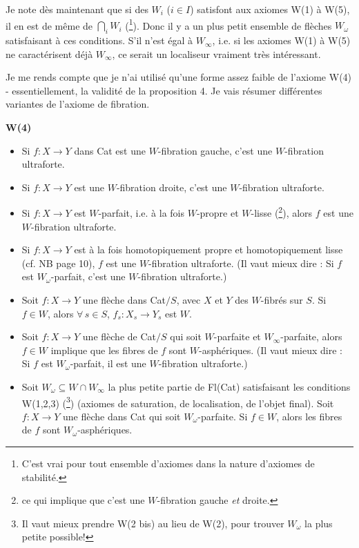 \documentclass[11pt]{article}
\newcommand{\printedpage}[1]{\marginpar{\footnotesize p.~#1}}
\newcommand{\msp}[1]{\marginpar{\footnotesize [#1]}}
\begin{document}
\printedpage{11}

Je note dès maintenant que si des $W_i$ ($i \in I$) satisfont aux axiomes W(1) à W(5), il en est de même de $\bigcap_i W_i$ (\footnote[30]{C'est vrai pour tout ensemble d'axiomes dans la nature d'axiomes de stabilité.}). Donc il y a un plus petit ensemble de flèches $W_\omega$ satisfaisant à ces conditions. S'il n'est égal à $W_\infty$, i.e. si les axiomes W(1) à W(5) ne caractérisent déjà $W_\infty$, ce serait un localiseur vraiment très intéressant.

Je me rends compte que je n'ai utilisé qu'une forme assez faible de l'axiome W(4) - essentiellement, la validité de la proposition 4. Je vais résumer différentes variantes de l'axiome de fibration.

\textbf{W(4)}

\begin{itemize}[leftmargin=4em, labelwidth=2.5em, labelsep=0.6em, align=right]
\item[a$_1$)] Si $f : X \longrightarrow Y$ dans Cat est une $W$-fibration gauche, c'est une $W$-fibration ultraforte.

\item[a$_2$)] Si $f : X \longrightarrow Y$ est une $W$-fibration droite, c'est une $W$-fibration ultraforte.

\item[a$'$)] Si $f : X \longrightarrow Y$ est $W$-parfait, i.e. à la fois $W$-propre et $W$-lisse (\footnote[31]{ce qui implique que c'est une $W$-fibration gauche \textit{et} droite.}), alors $f$ est une $W$-fibration ultraforte.

\item[a$''$)] Si $f : X \longrightarrow Y$ est à la fois homotopiquement propre et homotopiquement lisse (cf. NB page 10), $f$ est une $W$-fibration ultraforte. (Il vaut mieux dire : Si $f$ est $W_\omega$-parfait, c'est une $W$-fibration ultraforte.)

\item[b)] Soit $f : X \longrightarrow Y$ une flèche dans Cat$/S$, avec $X$ et $Y$ des $W$-fibrés sur $S$. Si $f \in W$, alors $\forall\, s \in S$, $f_s : X_s \longrightarrow Y_s$ est $W$.

\item[b$'$)] Soit $f : X \longrightarrow Y$ une flèche de Cat$/S$ qui soit $W$-parfaite et $W_\infty$-parfaite, alors $f \in W$ implique que les fibres de $f$ sont $W$-asphériques. (Il vaut mieux dire : Si $f$ est $W_\omega$-parfait, il est une $W$-fibration ultraforte.)

\item[b$''$)] \msp{page 14}Soit $W_\omega \subseteq W \cap W_\infty$ la plus petite partie de Fl(Cat) satisfaisant les conditions W(1,2,3) (\footnote[32]{Il vaut mieux prendre W(2 bis) au lieu de W(2), pour trouver $W_\omega$ la plus petite possible!}) (axiomes de saturation, de localisation, de l'objet final). Soit $f : X \longrightarrow Y$ une flèche dans Cat qui soit $W_\omega$-parfaite. Si $f \in W$, alors les fibres de $f$ sont $W_\omega$-asphériques.
\end{itemize}
\end{document}

